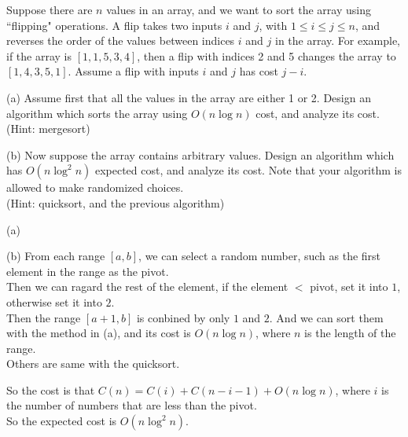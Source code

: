 \problem{}
Suppose there are $n$ values in an array, and we want to sort the array using ``flipping" operations.  A flip takes two inputs $i$ and $j$, with $1 \leq i \leq j \leq n$, and reverses the order of the values between indices $i$ and $j$ in the array.  For example, if the array is $[1,1,5,3,4]$, then a flip with indices 2 and 5 changes the array to $[1,4,3,5,1]$.  Assume a flip with inputs $i$ and $j$ has cost $j-i$.  

\hspace*{\fill}

\noindent (a) Assume first that all the values in the array are either 1 or 2.  Design an algorithm which sorts the array using $O(n \log n)$ cost, and analyze its cost.  \\
(Hint: mergesort)

\hspace*{\fill}

\noindent (b) Now suppose the array contains arbitrary values.   Design an algorithm which has $O(n \log^2 n)$ expected cost, and analyze its cost.  Note that your algorithm is allowed to make randomized choices. \\
(Hint: quicksort, and the previous algorithm)

\solution{}

(a)
    
    
    
    
    
    

(b) From each range $[a,b]$, we can select a random number, such as the first element in the range as the pivot.\\
Then we can ragard the rest of the element, if the element $<$ pivot, set it into $1$, otherwise set it into $2$.\\
Then the range $[a+1,b]$ is conbined by only $1$ and $2$. And we can sort them with the method in (a), and its cost is $O(n\log n)$, where $n$ is the length of the range.\\

Others are same with the quicksort.

So the cost is that $C(n)=C(i)+C(n-i-1)+O(n\log n)$, where $i$ is the number of numbers that are less than the pivot.\\

So the expected cost is $O(n\log^2n)$.




\newpage